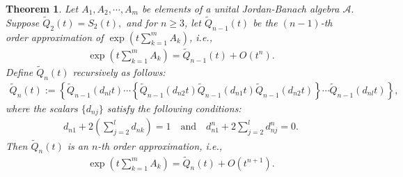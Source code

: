 \documentclass{article}
\theoremstyle{plain} %
\newtheorem{thm}{Theorem}[section]
\numberwithin{equation}{section}
\begin{document}
\begin{thm}\label{thm:Trotter:higher:symmetric:JordanBanach}
Let $A_1, A_2,\cdots, A_m$ be elements of a unital Jordan-Banach algebra $\mathcal{A}.$ Suppose $\widetilde{Q}_{2}(t)=S_2(t),$ and for $n\ge 3$, let $\widetilde{Q}_{n-1}(t)$ be the $(n-1)$-th order approximation of $\exp\left(t\sum_{k=1}^m A_k\right)$, i.e., 
    \begin{align}\label{eqt:n-1order:tqn-1}
       \exp\left(t\sum_{k=1}^m A_k\right)=\widetilde{Q}_{n-1}(t)+O(t^n). 
    \end{align}
Define $\widetilde{Q}_n(t)$ recursively as follows:
\begin{align}\label{eqt:norder:appro:constr}
 \widetilde{Q}_n(t):=\left\{\widetilde{Q}_{n-1}\left(d_{nl} t\right)\cdots\left\{\widetilde{Q}_{n-1}\left(d_{n2} t\right)\widetilde{Q}_{n-1}(d_{n1} t)\widetilde{Q}_{n-1}\left(d_{n2} t\right)\right\}\cdots \widetilde{Q}_{n-1}\left(d_{nl}t\right)\right\},   
\end{align}
where the scalars $\{d_{nj}\}$ satisfy the following conditions:
\begin{align}\label{eqt:norder:symmetric}
d_{n1}+2\left(\sum_{j=2}^l d_{nk}\right)=1\quad\mbox{and}\quad d_{n1}^n+2\sum_{j=2}^l d_{nj}^n=0.
\end{align}
Then $\widetilde{Q}_n(t)$ is an $n$-th order approximation, i.e., 
\begin{align}\label{eqt:norder:symmetric:appro}
     \exp\left(t\sum_{k=1}^m A_k\right)=\widetilde{Q}_{n}(t)+O(t^{n+1}). 
\end{align}
\end{thm}
\end{document}
